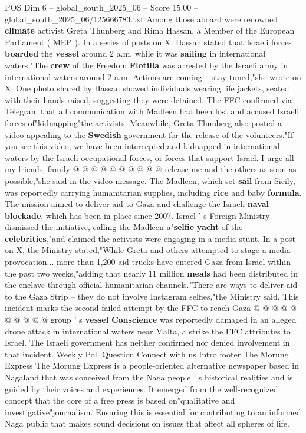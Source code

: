 \begin{textsample}{POS Dim 6 – global\_south\_2025\_06 – Score 15.00 – global\_south\_2025\_06/125666783.txt}  \label{ex:f6_pos_009}
Among those aboard were renowned \textbf{climate} activist Greta Thunberg and Rima Hassan, a Member of the European Parliament ( MEP ).
In a series of posts on X, Hassan stated that Israeli forces \textbf{boarded} the \textbf{vessel} around 2 a.m. while it was \textbf{sailing} in international waters."The \textbf{crew} of the Freedom \textbf{Flotilla} was arrested by the Israeli army in international waters around 2 a.m.
Actions are coming -- stay tuned,"she wrote on X.
One photo shared by Hassan showed individuals wearing life jackets, seated with their hands raised, suggesting they were detained.
The FFC confirmed via Telegram that all communication with Madleen had been lost and accused Israeli forces of"kidnapping"the activists.
Meanwhile, Greta Thunberg also posted a video appealing to the \textbf{Swedish} government for the release of the volunteers."If you see this video, we have been intercepted and kidnapped in international waters by the Israeli occupational forces, or forces that support Israel.
I urge all my friends, family @ @ @ @ @ @ @ @ @ @ release me and the others as soon as possible,"she said in the video message.
The Madleen, which set \textbf{sail} from Sicily, was reportedly carrying humanitarian supplies, including \textbf{rice} and baby \textbf{formula}.
The mission aimed to deliver aid to Gaza and challenge the Israeli \textbf{naval} \textbf{blockade}, which has been in place since 2007.
Israel ' s Foreign Ministry dismissed the initiative, calling the Madleen a"\textbf{selfie} \textbf{yacht} of the \textbf{celebrities},"and claimed the activists were engaging in a media stunt.
In a post on X, the Ministry stated,"While Greta and others attempted to stage a media provocation... more than 1,200 aid trucks have entered Gaza from Israel within the past two weeks,"adding that nearly 11 million \textbf{meals} had been distributed in the enclave through official humanitarian channels."There are ways to deliver aid to the Gaza Strip -- they do not involve Instagram selfies,"the Ministry said.
This incident marks the second failed attempt by the FFC to reach Gaza @ @ @ @ @ @ @ @ @ @ group ' s \textbf{vessel} \textbf{Conscience} was reportedly damaged in an alleged drone attack in international waters near Malta, a strike the FFC attributes to Israel.
The Israeli government has neither confirmed nor denied involvement in that incident.
Weekly Poll Question Connect with us Intro footer The Morung Express The Morung Express is a people-oriented alternative newspaper based in Nagaland that was conceived from the Naga people ' s historical realities and is guided by their voices and experiences.
It emerged from the well-recognized concept that the core of a free press is based on"qualitative and investigative"journalism.
Ensuring this is essential for contributing to an informed Naga public that makes sound decisions on issues that affect all spheres of life.

\end{textsample}
